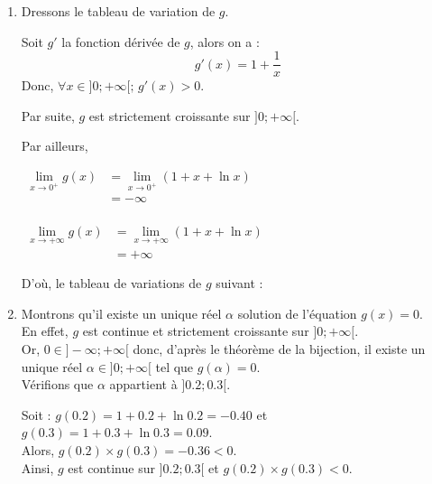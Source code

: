 \documentclass[12pt,a4paper]{article}
\begin{document}
\begin{enumerate}
    \item Dressons le tableau de variation de $g$.

Soit $g'$ la fonction dérivée de $g$, alors on a :
\[
g'(x) = 1 + \frac{1}{x}
\]
Donc, $\forall x \in ]0 ; +\infty[ ; \, g'(x) > 0$.

Par suite, $g$ est strictement croissante sur $]0 ; +\infty[$.

Par ailleurs,

$\begin{aligned}
\lim\limits_{x \to 0^+} g(x) &= \lim\limits_{x \to 0^+} (1 + x + \ln x)\\
&= -\infty \\
\end{aligned}$

$\begin{aligned}
\lim\limits_{x \to +\infty} g(x) &= \lim\limits_{x \to +\infty} (1 + x + \ln x) \\
&= +\infty
\end{aligned}$

D'où, le tableau de variations de $g$ suivant :


\item  Montrons qu'il existe un unique réel $\alpha$ solution de l'équation $g(x) = 0$.\\

En effet, $g$ est continue et strictement croissante sur $]0 ; +\infty[$.\\
Or, $0 \in ]-\infty ; +\infty[$ donc, d'après le théorème de la bijection, il existe un unique réel $\alpha \in ]0 ; +\infty[$ tel que $g(\alpha) = 0$.\\

Vérifions que $\alpha$ appartient à $]0.2 ; 0.3[$.

Soit : $g(0.2) = 1 + 0.2 + \ln 0.2 = -0.40$ et $g(0.3) = 1 + 0.3 + \ln 0.3 = 0.09$.\\
Alors, $g(0.2) \times g(0.3) = -0.36 < 0$.\\

Ainsi, $g$ est continue sur $]0.2 ; 0.3[$ et $g(0.2) \times g(0.3) < 0$.\\


\end{enumerate}
\end{document}
